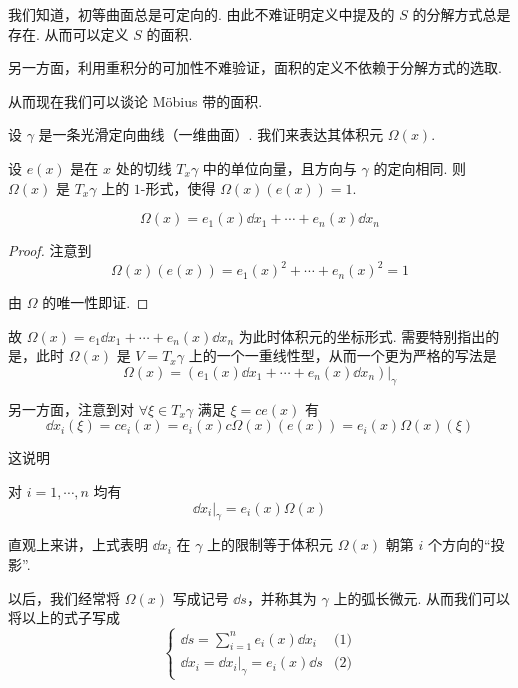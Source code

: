 \begin{hint}
    我们知道，初等曲面总是可定向的. 由此不难证明定义中提及的 $S$ 的分解方式总是存在. 从而可以定义 $S$ 的面积.

    另一方面，利用重积分的可加性不难验证，面积的定义不依赖于分解方式的选取.

    从而现在我们可以谈论 Möbius 带的面积.
\end{hint}



设 $\gamma$ 是一条光滑定向曲线（一维曲面）. 我们来表达其体积元 $\Omega(x)$.


设 $e(x)$ 是在 $x$ 处的切线 $T_x\gamma$ 中的单位向量，且方向与 $\gamma$ 的定向相同. 则 $\Omega(x)$ 是 $T_x\gamma$ 上的 $1$-形式，使得 $\Omega(x)(e(x))=1$.

\begin{property}
$$
\Omega(x)=e_1(x)\dd x_1+\cdots+e_n(x)\dd x_n
$$
\end{property}
\begin{proof}
    注意到
$$
\Omega(x)(e(x))=e_1(x)^2+\cdots+e_n(x)^2=1
$$

    由 $\Omega$ 的唯一性即证.
\end{proof}

故 $\Omega(x)=e_1\dd x_1+\cdots+e_n(x)\dd x_n$ 为此时体积元的坐标形式. 需要特别指出的是，此时 $\Omega(x)$ 是 $V=T_x\gamma$ 上的一个一重线性型，从而一个更为严格的写法是
$$
\Omega(x)=(e_1(x)\dd x_1+\cdots+e_n(x)\dd x_n)|_\gamma
$$

另一方面，注意到对 $\forall\xi\in T_x\gamma$ 满足 $\xi=ce(x)$ 有
$$
\dd x_i(\xi)=ce_i(x)=e_i(x)c\Omega(x)(e(x))=e_i(x)\Omega(x)(\xi)
$$

这说明
\begin{property}
    对 $i=1,\cdots,n$ 均有
$$
\dd x_i|_\gamma=e_i(x)\Omega(x)
$$
\end{property}

直观上来讲，上式表明 $\dd x_i$ 在 $\gamma$ 上的限制等于体积元 $\Omega(x)$ 朝第 $i$ 个方向的“投影”.

以后，我们经常将 $\Omega(x)$ 写成记号 $\dd s$，并称其为 $\gamma$ 上的弧长微元. 从而我们可以将以上的式子写成
$$
\begin{cases}
    \displaystyle\dd s=\sum_{i=1}^ne_i(x)\dd x_i & \text{(1)}\\
    \displaystyle\dd x_i=\dd x_i|_{\gamma}=e_i(x)\dd s & \text{(2)}
\end{cases}
$$

